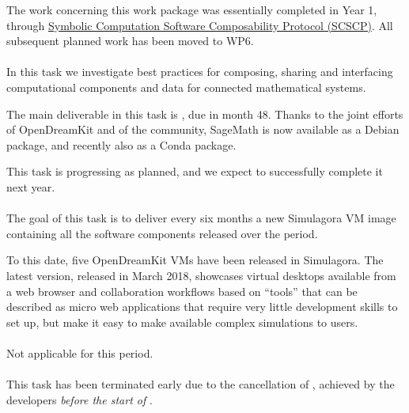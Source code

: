   The work concerning this work package was essentially completed in
  Year 1, through
  \href{http://www.symbolic-computing.org/science/index.php/SCSCP}{Symbolic
    Computation Software Composability Protocol (SCSCP)}. All
  subsequent planned work has been moved to WP6.

  
  \paragraph{}
  \label{component-architecture@mod-packaging}
  In this task we investigate best practices for composing, sharing
  and interfacing computational components and data for connected
  mathematical systems.

  The main deliverable in this task is
  , due in month
  48. Thanks to the joint efforts of OpenDreamKit and of the
  community, SageMath is now available as a Debian package, and
  recently also as a Conda package.

  This task is progressing as planned, and we expect to successfully
  complete it next year.

  \paragraph{}
  The goal of this task is to deliver every six months a new Simulagora
  VM image containing all the software components released over the
  period.

  To this date, five OpenDreamKit VMs have been released in
  Simulagora. The latest version, released in March 2018,
  showcases virtual desktops available from a web browser and
  collaboration workflows based on ``tools'' that can be described as
  micro web applications that require very little development skills
  to set up, but make it easy to make available complex simulations to
  users.
  
  \paragraph{}
  Not applicable for this period.

  \paragraph{}
  \label{component-architecture@extract-smc}
  This task has been terminated early due to the cancellation of
  , achieved by the
  \SMC developers \emph{before the start of \ODK}.

